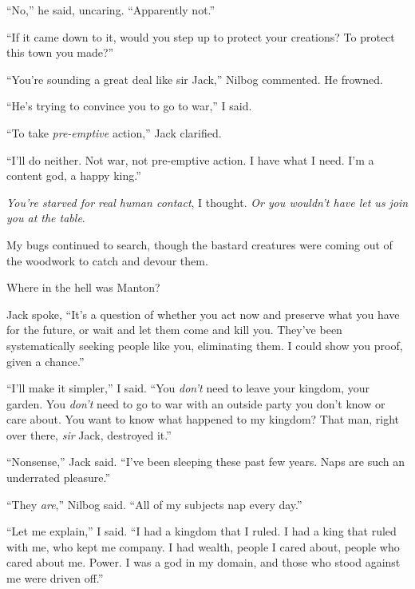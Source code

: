 ``No,'' he said, uncaring.  ``Apparently not.''



``If it came down to it, would you step up to protect your creations?  To protect this town you made?''



``You're sounding a great deal like sir Jack,'' Nilbog commented.  He frowned.



``He's trying to convince you to go to war,'' I said.



``To take \emph{pre-emptive} action,'' Jack clarified.



``I'll do neither.  Not war, not pre-emptive action.  I have what I need.  I'm a content god, a happy king.''



\emph{You're starved for real human contact}, I thought.  \emph{Or you wouldn't have let us join you at the table}.



My bugs continued to search, though the bastard creatures were coming out of the woodwork to catch and devour them.



Where in the hell was Manton?



Jack spoke, ``It's a question of whether you act now and preserve what you have for the future, or wait and let them come and kill you.  They've been systematically seeking people like you, eliminating them.  I could show you proof, given a chance.''



``I'll make it simpler,'' I said.  ``You \emph{don't} need to leave your kingdom, your garden.  You \emph{don't} need to go to war with an outside party you don't know or care about.  You want to know what happened to my kingdom?  That man, right over there, \emph{sir} Jack, destroyed it.''



``Nonsense,'' Jack said.  ``I've been sleeping these past few years.  Naps are such an underrated pleasure.''



``They \emph{are},'' Nilbog said.  ``All of my subjects nap every day.''



``Let me explain,'' I said.  ``I had a kingdom that I ruled.  I had a king that ruled with me, who kept me company.  I had wealth, people I cared about, people who cared about me.  Power.  I was a god in my domain, and those who stood against me were driven off.''



